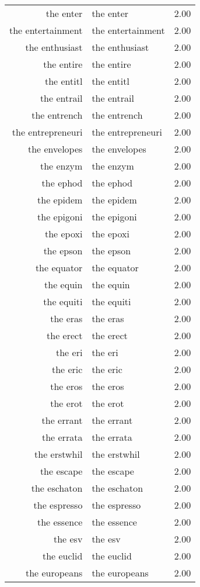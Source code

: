 \begin{table}[ht]
\begin{tabular}{rlr}
  the enter & the enter & 2.00 \\ 
  the entertainment & the entertainment & 2.00 \\ 
  the enthusiast & the enthusiast & 2.00 \\ 
  the entire & the entire & 2.00 \\ 
  the entitl & the entitl & 2.00 \\ 
  the entrail & the entrail & 2.00 \\ 
  the entrench & the entrench & 2.00 \\ 
  the entrepreneuri & the entrepreneuri & 2.00 \\ 
  the envelopes & the envelopes & 2.00 \\ 
  the enzym & the enzym & 2.00 \\ 
  the ephod & the ephod & 2.00 \\ 
  the epidem & the epidem & 2.00 \\ 
  the epigoni & the epigoni & 2.00 \\ 
  the epoxi & the epoxi & 2.00 \\ 
  the epson & the epson & 2.00 \\ 
  the equator & the equator & 2.00 \\ 
  the equin & the equin & 2.00 \\ 
  the equiti & the equiti & 2.00 \\ 
  the eras & the eras & 2.00 \\ 
  the erect & the erect & 2.00 \\ 
  the eri & the eri & 2.00 \\ 
  the eric & the eric & 2.00 \\ 
  the eros & the eros & 2.00 \\ 
  the erot & the erot & 2.00 \\ 
  the errant & the errant & 2.00 \\ 
  the errata & the errata & 2.00 \\ 
  the erstwhil & the erstwhil & 2.00 \\ 
  the escape & the escape & 2.00 \\ 
  the eschaton & the eschaton & 2.00 \\ 
  the espresso & the espresso & 2.00 \\ 
  the essence & the essence & 2.00 \\ 
  the esv & the esv & 2.00 \\ 
  the euclid & the euclid & 2.00 \\ 
  the europeans & the europeans & 2.00 \\ 

\end{tabular}
\end{table}
